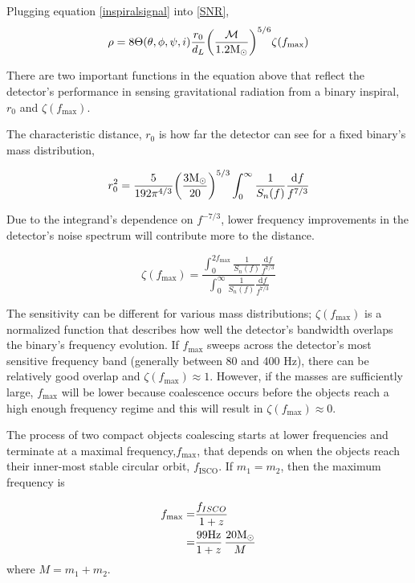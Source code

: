 	Plugging equation \ref{inspiralsignal} into \ref{SNR},
	\begin{equation}
	\rho = 8 \Theta(\theta,\phi,\psi,i) \frac{r_0}{d_L} \bigg(\frac{\mathcal{M}}{1.2 \textup{M}_\odot}\bigg)^{5/6} \zeta(f_{\text{max}})
	\end{equation}
	
	There are two important functions in the equation above that reflect the detector's performance in sensing gravitational radiation from a binary inspiral, $r_0$ and $\zeta(f_{\text{max}})$.
	
	The characteristic distance, $r_0$ is how far the detector can see for a fixed binary's mass distribution,
	
	\begin{equation}\label{char_r0}
	r_0^2 = \frac{5}{192\pi^{4/3}} \bigg(\frac{3\textup{M}_\odot}{20}\bigg)^{5/3}   \int_{0}^{\infty} \frac{1}{S_n(f)} \frac{\text{d} f}{f^{7/3}}
	\end{equation}

	Due to the integrand's dependence on $f^{-7/3}$, lower frequency improvements in the detector's noise spectrum will contribute more to the distance.
	
	\begin{equation}\label{zeta}
	\zeta(f_{\text{max}}) = \frac{\int_{0}^{2f_{\text{max}}} \frac{1}{S_n(f)} \frac{\text{d} f}{f^{7/3}}}{\int_{0}^{\infty} \frac{1}{S_n(f)} \frac{\text{d} f}{f^{7/3}}}
	\end{equation}
	
	The sensitivity can be different for various mass distributions; $\zeta(f_{\text{max}})$ is a normalized function that describes how well the detector's bandwidth overlaps the binary's frequency evolution.  If $f_{\text{max}}$ sweeps across the detector's most sensitive frequency band (generally between 80 and 400 Hz), there can be relatively good overlap and  $\zeta(f_{\text{max}})\approx 1$.  However, if the masses are sufficiently large, $f_{\text{max}}$ will be lower because coalescence occurs before the objects reach a high enough frequency regime and this will result in  $\zeta(f_{\text{max}})\approx 0$.
	
	The process of two compact objects coalescing starts at lower frequencies and terminate at a maximal frequency,$f_{\text{max}}$, that depends on when the objects reach their inner-most stable circular orbit, $f_{\text{ISCO}}$.   If $m_1=m_2$, then the maximum frequency is \cite{Finn:1995}
	
	\begin{equation}
	\begin{aligned}
	f_{\text{max}}	=&  \frac{f_{ISCO}}{1+z} \\
			=&	\frac{99 \text{Hz}}{1+z} \, \frac{20 \textup{M}_\odot}{M}
	\end{aligned}
	\end{equation}
	where $M=m_1+m_2$.  